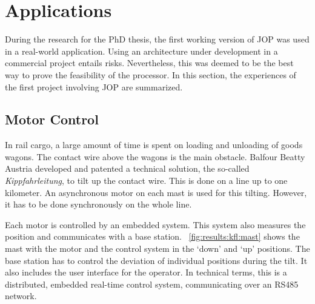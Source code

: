 %


\section{Applications}
\label{sec:applications}

During the research for the PhD thesis, the first working version of
JOP was used in a real-world application. Using an architecture under
development in a commercial project entails risks. Nevertheless, this
was deemed to be the best way to prove the feasibility of the
processor. In this section, the experiences of the first project
involving JOP are summarized.

\subsection{Motor Control}
\label{sec:app:kfl}

In rail cargo, a large amount of time is spent on loading and
unloading of goods wagons. The contact wire above the wagons is the
main obstacle. Balfour Beatty Austria developed and patented a
technical solution, the so-called \emph{Kippfahrleitung}, to tilt up
the contact wire. This is done on a line up to one kilometer. An
asynchronous motor on each mast is used for this tilting. However, it
has to be done synchronously on the whole line.

Each motor is controlled by an embedded system. This system also
measures the position and communicates with a base station.
\figurename~\ref{fig:results:kfl:mast} shows the mast with the motor
and the control system in the `down' and `up' positions. The base
station has to control the deviation of individual positions during
the tilt. It also includes the user interface for the operator. In
technical terms, this is a distributed, embedded real-time control
system, communicating over an RS485 network.

